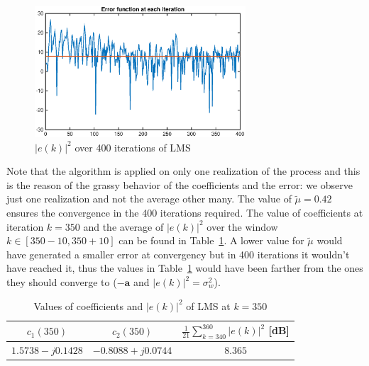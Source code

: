 \documentclass[10pt]{article}
\numberwithin{equation}{section}
\begin{document}
\begin{figure}[h!]
  \centering
  \includegraphics[width = 0.7\textwidth]{images/lms_err}
  \caption{$|e(k)|^2$ over 400 iterations of LMS}
  \label{fig:err_lms}
\end{figure}

Note that the algorithm is applied on only one realization of the process and this is the reason of the grassy behavior of the coefficients and the error: we observe just one realization and not the average other many. The value of $\tilde{\mu} = 0.42$ ensures the convergence in the 400 iterations required. The value of coefficients at iteration $k = 350$ and the average of $|e(k)|^2$ over the window $k \in [350 - 10, 350 + 10]$ can be found in Table~\ref{table:lms_conv}. A lower value for $\tilde{\mu}$ would have generated a smaller error at convergency but in 400 iterations it wouldn't have reached it, thus the values in Table~\ref{table:lms_conv} would have been farther from the ones they should converge to ($-\mathbf{a}$ and $|e(k)|^2 = \sigma_w^2$).
\begin{table}[h!]
  \centering
  \begin{tabular}{c|c|c}
    $c_1(350)$ &   $c_2(350)$ & $\frac{1}{21}\sum_{k=340}^{360} |e(k)|^2$ [dB] \\ \hline
    $1.5738 - j0.1428$ & $-0.8088 + j0.0744$ & $8.365$
  \end{tabular}
  \caption{Values of coefficients and $|e(k)|^2$ of LMS at $k=350$}
  \label{table:lms_conv}
\end{table}
\end{document}
